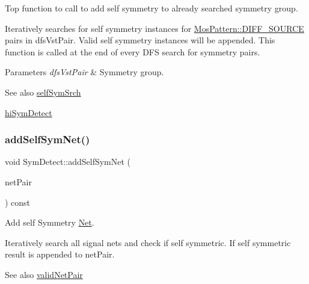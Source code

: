Top function to call to add self symmetry to already searched symmetry group. 

Iteratively searches for self symmetry instances for \hyperlink{type_8h_af19eddb079bfea723256710b029c38e8ad45b64a7d6b85dde1b52dd5a18863933}{Mos\+Pattern\+::\+D\+I\+F\+F\+\_\+\+S\+O\+U\+R\+CE} pairs in dfs\+Vst\+Pair. Valid self symmetry instances will be appended. This function is called at the end of every D\+FS search for symmetry pairs.


\begin{DoxyParams}{Parameters}
{\em dfs\+Vst\+Pair} & Symmetry group.\\
\hline
\end{DoxyParams}
\begin{DoxySeeAlso}{See also}
\hyperlink{classSymDetect_ab6f286024b013fa257295111016da18b}{self\+Sym\+Srch} 

\hyperlink{classSymDetect_a81ec317ab0f508b3e0af483ef8a2c1ac}{hi\+Sym\+Detect} 
\end{DoxySeeAlso}
\mbox{\label{classSymDetect_aecaa47ed0a3318167148a46d6458f83a}} 
\subsubsection{\texorpdfstring{add\+Self\+Sym\+Net()}{addSelfSymNet()}}
{\footnotesize\ttfamily void Sym\+Detect\+::add\+Self\+Sym\+Net (\begin{DoxyParamCaption}\item[{std\+::vector$<$ \hyperlink{classNetPair}{Net\+Pair} $>$ \&}]{net\+Pair }\end{DoxyParamCaption}) const\hspace{0.3cm}{\ttfamily [private]}}



Add self Symmetry \hyperlink{classNet}{Net}. 

Iteratively search all signal nets and check if self symmetric. If self symmetric result is appended to net\+Pair.

\begin{DoxySeeAlso}{See also}
\hyperlink{classSymDetect_a455e5f585e60c484e2d093a44775faf5}{valid\+Net\+Pair} 
\end{DoxySeeAlso}
\mbox{\label{classSymDetect_a3d47390c92f0bd31d1ab84f1a62d66e3}} 
